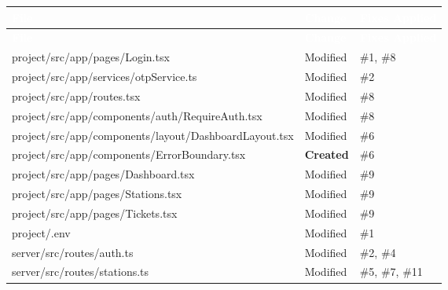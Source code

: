 \documentclass[12pt,a4paper]{report}
\begin{document}
	\begin{longtable}{
			>{\ttfamily\small}p{7.8cm}
			p{2.2cm}
			p{3.2cm}
		}
		\rowcolor{tablehead}
		\normalfont\textcolor{white}{\textbf{File}} &
		\textcolor{white}{\textbf{Change}} &
		\textcolor{white}{\textbf{Fixes Applied}} \\
		\endfirsthead
		\rowcolor{tablehead}
		\normalfont\textcolor{white}{\textbf{File}} &
		\textcolor{white}{\textbf{Change}} &
		\textcolor{white}{\textbf{Fixes Applied}} \\
		\endhead
		\bottomrule
		\endfoot
		
		\rowcolor{rowalt}
		project/src/app/pages/Login.tsx &
		\textcolor{highorange}{Modified} & \#1, \#8 \\
		
		project/src/app/services/otpService.ts &
		\textcolor{highorange}{Modified} & \#2 \\
		
		\rowcolor{rowalt}
		project/src/app/routes.tsx &
		\textcolor{highorange}{Modified} & \#8 \\
		
		project/src/app/components/auth/RequireAuth.tsx &
		\textcolor{highorange}{Modified} & \#8 \\
		
		\rowcolor{rowalt}
		project/src/app/components/layout/DashboardLayout.tsx &
		\textcolor{highorange}{Modified} & \#6 \\
		
		project/src/app/components/ErrorBoundary.tsx &
		\textcolor{greenfg}{\textbf{Created}} & \#6 \\
		
		\rowcolor{rowalt}
		project/src/app/pages/Dashboard.tsx &
		\textcolor{highorange}{Modified} & \#9 \\
		
		project/src/app/pages/Stations.tsx &
		\textcolor{highorange}{Modified} & \#9 \\
		
		\rowcolor{rowalt}
		project/src/app/pages/Tickets.tsx &
		\textcolor{highorange}{Modified} & \#9 \\
		
		project/.env &
		\textcolor{highorange}{Modified} & \#1 \\
		
		\rowcolor{rowalt}
		server/src/routes/auth.ts &
		\textcolor{highorange}{Modified} & \#2, \#4 \\
		
		server/src/routes/stations.ts &
		\textcolor{highorange}{Modified} & \#5, \#7, \#11 \\
		

\end{longtable}
\end{document}
